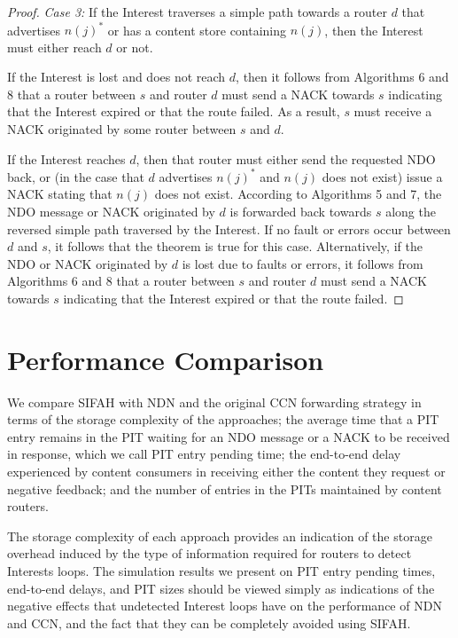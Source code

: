 \documentclass{ancs15-alternate}
\begin{document}
\begin{proof}
{\em Case 3:} If the Interest  traverses a simple path towards a router $d$ that advertises $n(j)^*$ or has a content store containing $n(j)$, then the Interest must either reach $d$ or not. 

If the Interest is lost and does not reach $d$, then it follows from Algorithms 6 and 8 that a router between $s$ and router $d$  must send a NACK towards $s$ indicating  that the Interest expired or that the route failed. As a result, $s$ must receive a NACK originated by some router between $s$ and $d$.

If the Interest reaches $d$, then that router must either send the requested NDO back, or (in the case that $d$ advertises $n(j)^*$ and $n(j)$ does not exist) issue a NACK stating that 
$n(j)$ does not exist. According to Algorithms 5 and 7, the NDO message or NACK originated by $d$ is forwarded back towards $s$ along the reversed simple path traversed by the Interest.  If no fault or errors occur between $d$ and $s$, it follows that the theorem is true for this case. Alternatively, if the NDO or NACK originated by $d$ is lost due to faults or errors, it follows from  Algorithms 6 and 8 that a router between $s$ and  router $d$ must send a NACK towards $s$ indicating  that the Interest expired or that the route failed. 
\end{proof}


\section{Performance Comparison}
\label{sec-perf}

We compare SIFAH with NDN and the original CCN forwarding strategy in terms of the storage complexity of the approaches;
the average time that a PIT entry remains in the PIT waiting for an NDO message or a NACK to be received in response, which we call PIT entry pending time; the end-to-end delay experienced by content consumers in receiving either the content they request or negative feedback; and the number of entries in the PITs maintained by content routers.

The storage complexity of each approach provides an indication of the storage overhead induced by the type of information required for routers to detect Interests loops. The simulation results we present on  PIT entry pending times, end-to-end delays, and PIT sizes 
should be viewed simply as indications of the negative effects that undetected Interest loops have on the performance of NDN and CCN, and the fact that they can be completely avoided using SIFAH. 
\end{document}
